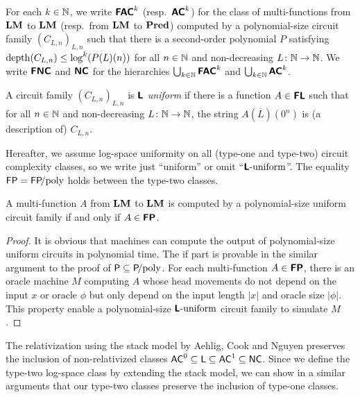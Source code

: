 \documentclass[envcountsame,orivec,oribibl]{llncs}
\begin{document}

\begin{definition}
 For each $k \in \mathbb N$, 
 we write $\text{\bfseries \sffamily \upshape FAC}^k$ (resp.\ $\text{\bfseries \sffamily \upshape AC}^k$) for the class of 
 multi-functions from $\mathbf{LM}$ to $\mathbf{LM}$ (resp.\ from $\mathbf{LM}$ to $\mathbf{Pred}$) computed by
 a polynomial-size circuit family $(C_{L,n})_{L,n}$ such that
 there is a second-order polynomial $P$ satisfying
 $\mathop{\rm depth}(C_{L,n}) \le \log^k(P(L)(n))$ 
 for all $n \in \mathbb N$ and non-decreasing
 $L \colon \mathbb N \to \mathbb N$.
 We write $\text{\bfseries \sffamily \upshape FNC}$ and $\text{\bfseries \sffamily \upshape NC}$ for the hierarchies
 $\bigcup_{k \in \mathbb N} \text{\bfseries \sffamily \upshape FAC}^k$ and $\bigcup_{k \in \mathbb N} \text{\bfseries \sffamily \upshape AC}^k$.
\end{definition}

\begin{definition}
A circuit family $(C_{L,n})_{L,n}$ is \emph{$\text{\bfseries \sffamily \upshape L}$ uniform} if there is a function $A \in \text{\bfseries \sffamily \upshape FL}$ 
such that for all $n \in \mathbb N$ and non-decreasing $L \colon \mathbb N \to \mathbb N$, 
the string $A (\overline L) (0^n)$ is (a description of) $C_{L,n}$. 
\end{definition}

Hereafter, we assume log-space uniformity on all (type-one and type-two) 
circuit complexity classes, so we write just ``uniform'' or omit ``$\text{\bfseries \sffamily \upshape L}\text{-uniform}$''.
The equality $\mathsf{FP} = \mathsf{FP}\!\text{/poly}$ holds
between the type-two classes.

\begin{theorem}
\label{theorem:P-equals-L-uniform-P-poly}
A multi-function $A$ from $\mathbf{LM}$ to $\mathbf{LM}$ is computed by a polynomial-size
uniform circuit family if and only if $A \in \text{\bfseries \sffamily \upshape FP}$.
\end{theorem}

\begin{proof}
 It is obvious that machines can compute the output of
 polynomial-size uniform circuits in polynomial time.
 The if part is provable in the similar argument to the proof of
 $\mathsf{P} \subseteq \mathsf{P}\!\text{/poly}$.
 For each multi-function $A \in \text{\bfseries \sffamily \upshape FP}$, there is an oracle machine $M$
 computing $A$ whose head movements do not depend on the input $x$ or oracle
 $\phi$ but only depend on the input length $|x|$ and oracle size $|\phi|$.
 This property enable a polynomial-size $\text{\bfseries \sffamily \upshape L}\text{-uniform}$ circuit family to simulate $M$.
\end{proof}

The relativization using the stack model by Aehlig, Cook and Nguyen preserves
the inclusion of non-relativized classes
$\mathsf{AC}^0 \subseteq \mathsf{L} \subseteq \mathsf{AC}^1 \subseteq \mathsf{NC}$.
Since we define the type-two log-space class by extending the stack model,
we can show in a similar arguments 
that our type-two classes preserve the inclusion of type-one classes.
\end{document}

